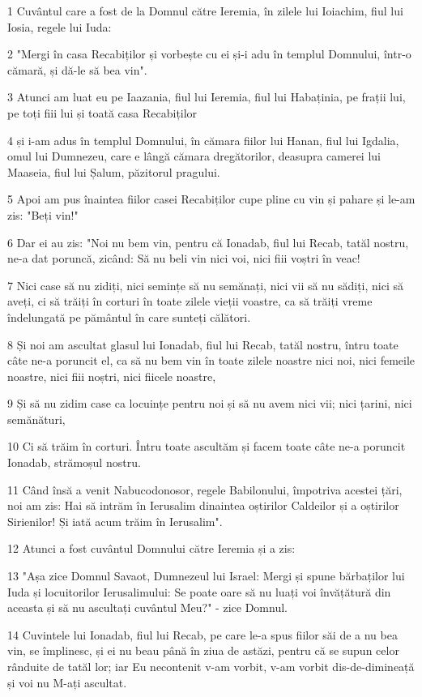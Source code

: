 \par 1 Cuvântul care a fost de la Domnul către Ieremia, în zilele lui Ioiachim, fiul lui Iosia, regele lui Iuda:
\par 2 "Mergi în casa Recabiților și vorbește cu ei și-i adu în templul Domnului, într-o cămară, și dă-le să bea vin".
\par 3 Atunci am luat eu pe Iaazania, fiul lui Ieremia, fiul lui Habaținia, pe frații lui, pe toți fiii lui și toată casa Recabiților
\par 4 și i-am adus în templul Domnului, în cămara fiilor lui Hanan, fiul lui Igdalia, omul lui Dumnezeu, care e lângă cămara dregătorilor, deasupra camerei lui Maaseia, fiul lui Șalum, păzitorul pragului.
\par 5 Apoi am pus înaintea fiilor casei Recabiților cupe pline cu vin și pahare și le-am zis: "Beți vin!"
\par 6 Dar ei au zis: "Noi nu bem vin, pentru că Ionadab, fiul lui Recab, tatăl nostru, ne-a dat poruncă, zicând: Să nu beli vin nici voi, nici fiii voștri în veac!
\par 7 Nici case să nu zidiți, nici semințe să nu semănați, nici vii să nu sădiți, nici să aveți, ci să trăiți în corturi în toate zilele vieții voastre, ca să trăiți vreme îndelungată pe pământul în care sunteți călători.
\par 8 Și noi am ascultat glasul lui Ionadab, fiul lui Recab, tatăl nostru, întru toate câte ne-a poruncit el, ca să nu bem vin în toate zilele noastre nici noi, nici femeile noastre, nici fiii noștri, nici fiicele noastre,
\par 9 Și să nu zidim case ca locuințe pentru noi și să nu avem nici vii; nici țarini, nici semănături,
\par 10 Ci să trăim în corturi. Întru toate ascultăm și facem toate câte ne-a poruncit Ionadab, strămoșul nostru.
\par 11 Când însă a venit Nabucodonosor, regele Babilonului, împotriva acestei țări, noi am zis: Hai să intrăm în Ierusalim dinaintea oștirilor Caldeilor și a oștirilor Sirienilor! Și iată acum trăim în Ierusalim".
\par 12 Atunci a fost cuvântul Domnului către Ieremia și a zis:
\par 13 "Așa zice Domnul Savaot, Dumnezeul lui Israel: Mergi și spune bărbaților lui Iuda și locuitorilor Ierusalimului: Se poate oare să nu luați voi învățătură din aceasta și să nu ascultați cuvântul Meu?" - zice Domnul.
\par 14 Cuvintele lui Ionadab, fiul lui Recab, pe care le-a spus fiilor săi de a nu bea vin, se împlinesc, și ei nu beau până în ziua de astăzi, pentru că se supun celor rânduite de tatăl lor; iar Eu necontenit v-am vorbit, v-am vorbit dis-de-dimineață și voi nu M-ați ascultat.

